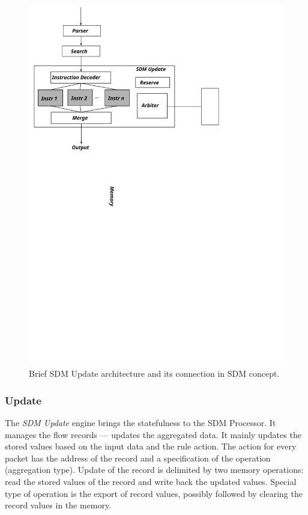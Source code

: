 \begin{figure}[b]
\centering
\includegraphics[scale=0.58]{chapters/pic/sdm_update_sch}
\caption{Brief SDM Update architecture and its connection in SDM concept.}
\label{fig:sdmBrief}
\end{figure}

\subsubsection*{Update}
The \textit{SDM Update} engine brings the statefulness to the SDM Processor. 
It manages the flow records --- updates the aggregated data.
It mainly updates the stored values based on the input data and the rule action.
The action for every packet has the address of the record and a specification of the operation
(aggregation type). Update of the record is delimited by two memory operations: read the stored values of
the record and write back the updated values. 
Special type of operation is the export of record values,
possibly followed by clearing the record values in the memory. 

